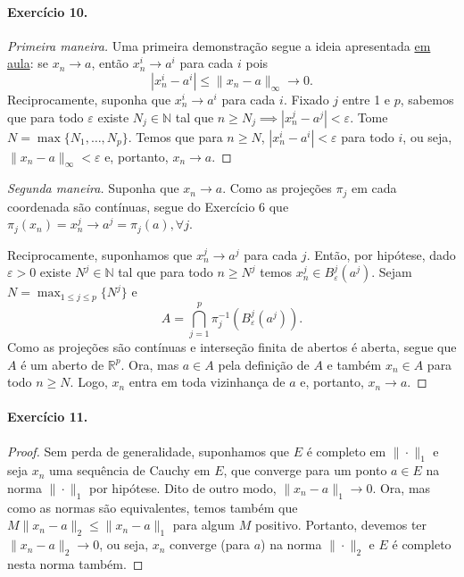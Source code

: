 \documentclass[12pt,a4paper]{article}
\begin{document}
\paragraph{Exercício 10.}
\begin{proof}[Primeira maneira]
    Uma primeira demonstração segue a ideia apresentada
    \href{https://www.youtube.com/watch?v=ph3VUO0AVRA&list=PLMG2ETzS-iy95U-hwPhPRSGRHBFm8Dk2x&index=5}{em aula}: se $x_n \to a$, então
    $x_n^i \to a^i$ para cada $i$ pois
    \begin{equation*}
        |x_n^i - a^i| \leq \|x_n - a\|_{\infty} \to 0.
    \end{equation*}
    Reciprocamente, suponha que $x_n^i \to a^i$ para cada $i$. Fixado $j$ entre 1 e $p$, sabemos que para todo $\varepsilon$ existe
    $N_j\in\mathbb{N}$ tal que $n\geq N_j \implies |x_n^j - a^j| < \varepsilon$. Tome $N = \max\{N_1, \dots, N_p\}$. Temos que
    para $n\geq N$, $|x_n^i - a^i| < \varepsilon$ para todo $i$, ou seja, $\|x_n - a\|_{\infty} < \varepsilon$ e, portanto, 
    $x_n \to a$.
\end{proof}

\begin{proof}[Segunda maneira]
    Suponha que $x_n \to a$. Como as projeções $\pi_j$ em cada coordenada são contínuas,
    segue do Exercício 6 que $\pi_j(x_n) = x_n^j \to a^j = \pi_j(a), \forall j$. 
    
    Reciprocamente, suponhamos que $x_n^j \to a^j$ para cada $j$. Então, por hipótese, dado $\varepsilon > 0$ existe
    $N^j\in\mathbb{N}$ tal que para todo $n\geq N^j$ temos $x_n^j \in B_{\varepsilon}^j(a^j)$. 
    Sejam $N = \max_{1\leq j\leq p}\{N^j\}$ e
    \begin{equation*}
        A = \bigcap_{j=1}^p \pi_j^{-1}(B_{\varepsilon}^j(a^j)).
    \end{equation*}
    Como as projeções são contínuas e interseção finita de abertos é aberta, segue que $A$ é um aberto de $\mathbb{R}^p$.
    Ora, mas $a\in A$ pela definição de $A$ e também $x_n \in A$ para todo $n\geq N$. Logo, $x_n$ entra em toda vizinhança
    de $a$ e, portanto, $x_n \to a$.
\end{proof}

\paragraph{Exercício 11.}
\begin{proof}
Sem perda de generalidade, suponhamos que $E$ é completo em $\|\cdot \|_1$ e seja $x_n$ uma sequência de Cauchy em $E$, 
que converge para um ponto $a\in E$ na norma $\|\cdot \|_1$ por hipótese. Dito de outro modo, $\|x_n-a\|_1 \to 0$. 
Ora, mas como as normas são equivalentes, temos também que $M\|x_n - a\|_2 \leq \|x_n - a\|_1$ para algum $M$ positivo. 
Portanto, devemos ter $\|x_n-a\|_2 \to 0$, ou seja, $x_n$ converge (para $a$) na norma $\|\cdot \|_2$ e $E$ é completo nesta norma
também.
\end{proof}
\end{document}
